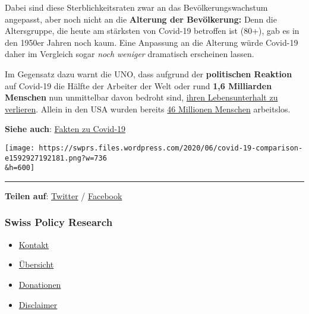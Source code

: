 Dabei sind diese Sterblichkeitsraten zwar an das Bevölkerungswachstum
angepasst, aber noch nicht an die \textbf{Alterung der Bevölkerung:}
Denn die Altersgruppe, die heute am stärksten von Covid-19 betroffen ist
(80+), gab es in den 1950er Jahren noch kaum. Eine Anpassung an die
Alterung würde Covid-19 daher im Vergleich sogar \emph{noch weniger}
dramatisch erscheinen lassen.

Im Gegensatz dazu warnt die UNO, dass aufgrund der \textbf{politischen
Reaktion} auf Covid-19 die Hälfte der Arbeiter der Welt oder rund
\textbf{1,6 Milliarden Menschen} nun unmittelbar davon bedroht sind,
\href{https://www.theguardian.com/world/2020/apr/29/half-of-worlds-workers-at-immediate-risk-of-losing-livelihood-due-to-coronavirus}{ihren
Lebensunterhalt zu verlieren}. Allein in den USA wurden bereits
\href{https://www.businessinsider.com/us-weekly-jobless-claims-unemployment-insurance-filings-economy-coronavirus-recession-2020-6}{46
Millionen Menschen} arbeitslos.

\textbf{Siehe auch}:
\href{https://swprs.org/covid-19-hinweis-ii/}{Fakten zu Covid-19}

\texttt{[image: https://swprs.files.wordpress.com/2020/06/covid-19-comparison-e1592927192181.png?w=736\\\&h=600]}

\begin{center}\rule{0.5\linewidth}{\linethickness}\end{center}

\textbf{Teilen auf}:
\href{https://twitter.com/intent/tweet?url=https://swprs.org/covid-19-letalitat-wie-man-es-nicht-macht/}{Twitter}
/
\href{https://www.facebook.com/share.php?u=https://swprs.org/covid-19-letalitat-wie-man-es-nicht-macht/}{Facebook}

\hypertarget{swiss-policy-research}{%
\subsubsection{Swiss Policy Research}\label{swiss-policy-research}}

\begin{itemize}
\tightlist
\item
  \href{https://swprs.org/kontakt/}{Kontakt}
\item
  \href{https://swprs.org/uebersicht/}{Übersicht}
\item
  \href{https://swprs.org/donationen/}{Donationen}
\item
  \href{https://swprs.org/disclaimer/}{Disclaimer}
\end{itemize}

